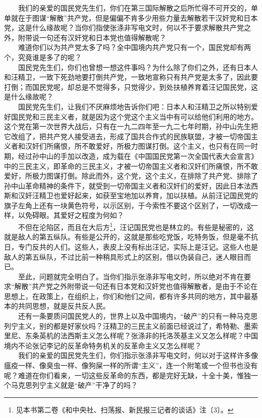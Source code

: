 \documentclass[cn,11pt,chinese]{elegantbook}
\begin{document}
　　我们的亲爱的国民党先生们，你们在第三国际解散之后所忙得不可开交的，单单就在于图谋“解散”共产党，但是偏偏不肯多少用些力量去解散若干汉奸党和日本党，这是什么缘故呢？当你们指使张涤非写电文时，何以不于要求解散共产党之外，附带说一句还有汉奸党和日本党也值得解散呢？\\
　　难道你们以为共产党太多了吗？全中国境内共产党只有一个，国民党却有两个，究竟谁是多了的呢？\\
　　国民党先生们，你们也曾想一想这件事吗？为什么除了你们之外，还有日本人和汪精卫，一致下死劲地要打倒共产党，一致地宣称只有共产党是太多了，因此要打倒；而国民党呢，却总是不觉得多，只觉得少，到处扶植养育着汪记国民党，这是什么缘故呢？\\
　　国民党先生们，让我们不厌麻烦地告诉你们吧：日本人和汪精卫之所以特别爱好国民党和三民主义者，就是因为这个党这个主义当中有可以给他们利用的地方。这个党在第一次世界大战后，只有在一九二四年至一九二七年时期，孙中山先生把它改组了，把共产党人接受进去，形成了国共合作式的民族联盟，才被一切帝国主义者和汉奸们所痛恨，所不敢爱好，所极力图谋打倒。这个主义，也只有在同一时期，经过孙中山的手加以改造，成为载在《中国国民党第一次全国代表大会宣言》中的三民主义，即革命的三民主义，才被一切帝国主义者和汉奸们所痛恨，所不敢爱好，所极力图谋打倒。除此而外，这个党，这个主义，在排除了共产党、排除了孙中山革命精神的条件下，就受到一切帝国主义者和汉奸们的爱好，因此日本法西斯和汉奸汪精卫也爱好起来，如获至宝地加以养育，加以扶植。从前汪记国民党的旗子左角上还有一块黄色符号，以示区别，于今索性不要这个区别了，一切改成一样，以免碍眼。其爱好之程度为何如？\\
　　不但在沦陷区，而且在大后方\footnote[3]{ 见本书第二卷《和中央社、扫荡报、新民报三记者的谈话》注〔3〕。}，汪记国民党也是林立的。有些是秘密的，这就是敌人的第五纵队。有些是公开的，这就是那些吃党饭，吃特务饭，但是毫不抗日，专门反共的人们。这些人，表皮上没有标出汪记，实际上是汪记。这些人也是敌人的第五纵队，不过比前一种稍具形式上的区别，借以伪装自己，迷人眼目而已。\\
　　至此，问题就完全明白了。当你们指示张涤非写电文时，所以绝对不肯在要求“解散”共产党之外附带说一句还有日本党和汉奸党也值得解散者，是由于不论在思想上，在政策上，在组织上，你们和他们之间，都有许多共同的地方，其中最基本的共同思想，就是反共反人民。\\
　　还有一条要质问国民党人的，世界上以及中国境内，“破产”的只有一种马克思列宁主义，别的都是好家伙吗？汪精卫的三民主义前面已经说过了，希特勒、墨索里尼、东条英机的法西斯主义怎么样呢？张涤非的托洛茨基主义又怎么样呢？中国境内不论张记李记的反革命特务机关的反革命主义又怎么样呢？\\
　　我们的亲爱的国民党先生们，你们指示张涤非写电文时，何以对于这样许多像瘟疫一样、像臭虫一样、像狗屎一样的所谓“主义”，连一个附笔或一个但书也没有呢？难道在你们看来，一切这些反革命的东西，都是完好无缺，十全十美，惟独一个马克思列宁主义就是“破产”干净了的吗？\\
\end{document}
